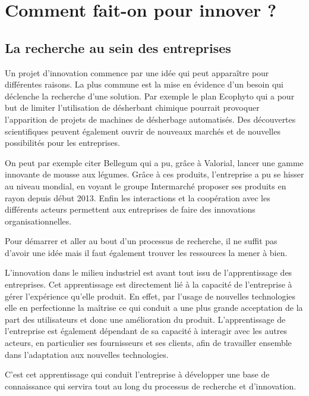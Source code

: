 \documentclass[a4paper,12pt]{report}
\begin{document}
	\section{Comment fait-on pour innover ?}
			
		\subsection{La recherche au sein des entreprises}
			Un projet d’innovation commence par une idée qui peut apparaître pour différentes raisons. La plus commune est la mise en évidence d’un besoin qui déclenche la recherche d’une solution. Par exemple le plan Ecophyto\cite{RobotsChamps} qui a pour but de limiter l’utilisation de désherbant chimique pourrait provoquer l’apparition de projets de machines de désherbage automatisés. 
			Des découvertes scientifiques peuvent également ouvrir de nouveaux marchés et de nouvelles possibilités pour les entreprises. 
			
			On peut par exemple citer Bellegum\cite{Bellegum} qui a pu, grâce à Valorial, lancer une gamme innovante de mousse aux légumes. Grâce à ces produits, l’entreprise a pu se hisser au niveau mondial, en voyant le groupe Intermarché proposer ses produits en rayon depuis début 2013.
			Enfin les interactions et la coopération avec les différents acteurs permettent aux entreprises de faire des innovations organisationnelles.
			
			Pour démarrer et aller au bout d’un processus de recherche, il ne suffit pas d’avoir une idée mais il faut également trouver les ressources la mener à bien.
			
			L’innovation dans le milieu industriel est avant tout issu de l’apprentissage des entreprises. Cet apprentissage est directement lié à la capacité de l’entreprise à gérer l’expérience qu’elle produit. En effet, par l’usage de nouvelles technologies elle en perfectionne la maîtrise ce qui conduit a une plus grande acceptation de la part des utilisateurs et donc une amélioration du produit. 
			L’apprentissage de l’entreprise est également dépendant de sa capacité à interagir avec les autres acteurs, en particulier ses fournisseurs et ses clients, afin de travailler ensemble dans l’adaptation aux nouvelles technologies.
			
			C’est cet apprentissage qui conduit l’entreprise à développer une base de connaissance qui servira tout au long du processus de recherche et d’innovation.
			
\end{document}
